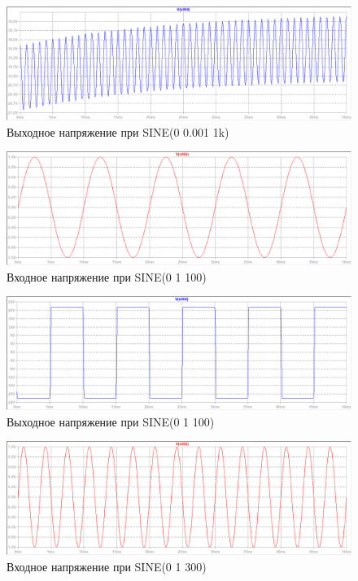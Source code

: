 \documentclass[a4paper, 12pt]{article}
\begin{document}
    \begin{figure}[H]
        \centering
        \includegraphics[scale=0.46]{3task_sine_out_1mV_1kf.png}
        \captionsetup{skip=0pt}
        \caption{Выходное напряжение при SINE(0 0.001 1k)}
        \label{fig:3task_sine_in_1mV_1kf}
    \end{figure}
    \begin{figure}[H]
        \centering
        \includegraphics[scale=0.46]{3task_sine_in_1V_100f.png}
        \captionsetup{skip=0pt}
        \caption{Входное напряжение при SINE(0 1 100)}
        \label{fig:3task_sine_in_1V_100f}
    \end{figure}
    \begin{figure}[H]
        \centering
        \includegraphics[scale=0.46]{3task_sine_out_1V_100f.png}
        \captionsetup{skip=0pt}
        \caption{Выходное напряжение при SINE(0 1 100)}
        \label{fig:3task_sine_in_1V_100f}
    \end{figure}
    \begin{figure}[H]
        \centering
        \includegraphics[scale=0.46]{3task_sine_in_1V_300f.png}
        \captionsetup{skip=0pt}
        \caption{Входное напряжение при SINE(0 1 300)}
        \label{fig:3task_sine_in_1V_300f}
    \end{figure}
\end{document}
